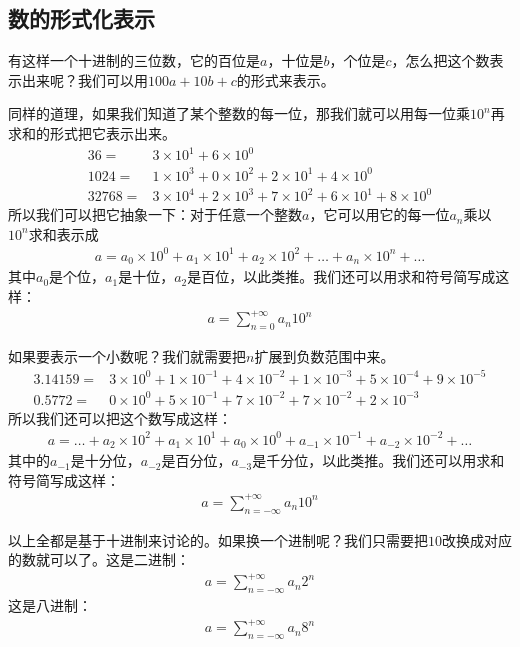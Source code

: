 \subsection*{数的形式化表示}
有这样一个十进制的三位数，它的百位是$a$，十位是$b$，个位是$c$，怎么把这个数表示出来呢？我们可以用$100a+10b+c$的形式来表示。\par
同样的道理，如果我们知道了某个整数的每一位，那我们就可以用每一位乘$10^n$再求和的形式把它表示出来。
\begin{align*}
36={}&3\times10^1+6\times10^0\\
1024={}&1\times10^3+0\times10^2+2\times10^1+4\times10^0\\
32768={}&3\times10^4+2\times10^3+7\times10^2+6\times10^1+8\times10^0
\end{align*}
所以我们可以把它抽象一下：对于任意一个整数$a$，它可以用它的每一位$a_n$乘以$10^n$求和表示成
\begin{align*}
a=a_0\times10^0+a_1\times10^1+a_2\times10^2+\ldots+a_n\times10^n+\ldots
\end{align*}
其中$a_0$是个位，$a_1$是十位，$a_2$是百位，以此类推。我们还可以用求和符号简写成这样：
\begin{align*}
a=\sum_{n=0}^{+\infty}a_n10^n
\end{align*}\par
如果要表示一个小数呢？我们就需要把$n$扩展到负数范围中来。
\begin{align*}
3.14159={}&3\times10^0+1\times10^{-1}+4\times10^{-2}+1\times10^{-3}+5\times10^{-4}+9\times10^{-5}\\
0.5772={}&0\times10^0+5\times10^{-1}+7\times10^{-2}+7\times10^{-2}+2\times10^{-3}
\end{align*}
所以我们还可以把这个数写成这样：
\begin{align*}
a=\ldots+a_2\times10^2+a_1\times10^1+a_0\times10^0+a_{-1}\times10^{-1}+a_{-2}\times10^{-2}+\ldots
\end{align*}
其中的$a_{-1}$是十分位，$a_{-2}$是百分位，$a_{-3}$是千分位，以此类推。我们还可以用求和符号简写成这样：
\begin{align*}
a=\sum_{n=-\infty}^{+\infty}a_n10^n
\end{align*}\par
以上全都是基于十进制来讨论的。如果换一个进制呢？我们只需要把$10$改换成对应的数就可以了。这是二进制：
\begin{align*}
a=\sum_{n=-\infty}^{+\infty}a_n2^n
\end{align*}
这是八进制：
\begin{align*}
a=\sum_{n=-\infty}^{+\infty}a_n8^n
\end{align*}
